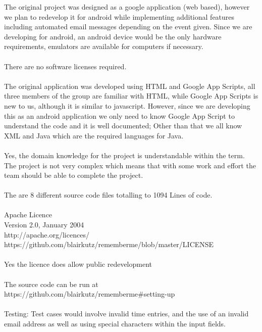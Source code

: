 \documentclass[a4paper]{article}
\begin{document}
The original project was designed as a google application (web based), however we plan to redevelop it for android while implementing additional features including automated email messages depending on the event given. Since we are developing for android, an android device would be the only hardware requirements, emulators are available for computers if necessary.
~\\~\\
There are no software licenses required.  
~\\~\\
The original application was developed using HTML and Google App Scripts, all three members of the group are familiar with HTML, while Google App Scripts is new to us, although it is similar to javascript. However, since we are developing this as an android application we only need to know Google App Script to understand the code and it is well documented; Other than that we all know XML and Java which are the required languages for Java. 
~\\~\\
Yes, the domain knowledge for the project is understandable within the term. The project is not very complex which means that with some work and effort the team should be able to complete the project. 
~\\~\\
The are 8 different source code files totalling to 1094 Lines of code. 
~\\~\\
Apache Licence \\
Version 2.0, January 2004\\
http://apache.org/licences/\\
https://github.com/blairkutz/rememberme/blob/master/LICENSE
~\\~\\
Yes the licence does allow public redevelopment
~\\~\\
The source code can be run at https://github.com/blairkutz/rememberme\#setting-up
~\\~\\
Testing: Test cases would involve invalid time entries, and the use of an invalid email address as well as using special characters within the input fields.
\end{document}
